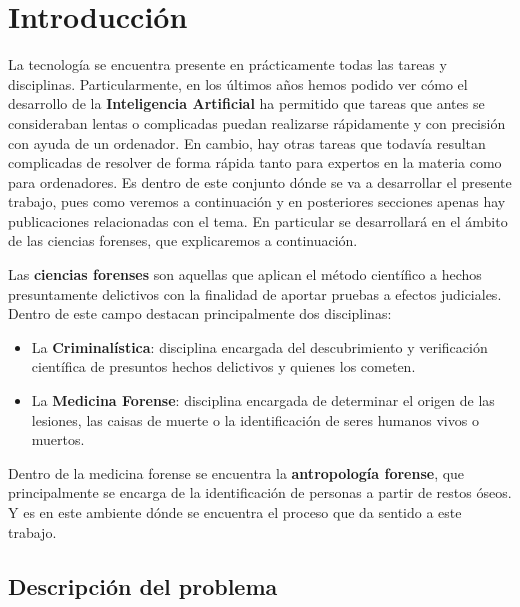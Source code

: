 
\chapter{Introducción}  \label{ch:Introduccion_informatica}

\noindent La tecnología se encuentra presente en prácticamente todas las tareas y disciplinas. Particularmente, en los últimos años hemos podido ver cómo el desarrollo de la \textbf{Inteligencia Artificial} ha permitido que tareas que antes se consideraban lentas o complicadas puedan realizarse rápidamente y con precisión con ayuda de un ordenador. En cambio, hay otras tareas que todavía resultan complicadas de resolver de forma rápida tanto para expertos en la materia como para ordenadores. Es dentro de este conjunto dónde se va a desarrollar el presente trabajo, pues como veremos a continuación y en posteriores secciones apenas hay publicaciones relacionadas con el tema. En particular se desarrollará en el ámbito de las ciencias forenses, que explicaremos a continuación.

\medskip

\noindent Las \textbf{ciencias forenses} son aquellas que aplican el método científico a hechos presuntamente delictivos con la finalidad de aportar pruebas a efectos judiciales. Dentro de este campo destacan principalmente dos disciplinas: 

\begin{itemize}
    \item La \textbf{Criminalística}: disciplina encargada del descubrimiento y verificación científica de presuntos hechos delictivos y quienes los cometen.
    \item La \textbf{Medicina Forense}: disciplina encargada de determinar el origen de las lesiones, las caisas de muerte o la identificación de seres humanos vivos o muertos.
\end{itemize}

\medskip

\noindent Dentro de la medicina forense se encuentra la \textbf{antropología forense}, que principalmente se encarga de la identificación de personas a partir de restos óseos. Y es en este ambiente dónde se encuentra el proceso que da sentido a este trabajo.


\section{Descripción del problema}


